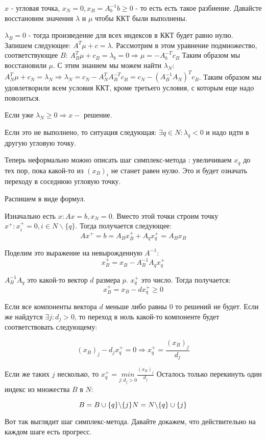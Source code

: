 $x$ - угловая точка, $x_N = 0, x_B = A_b^{-1}b \ge 0$ - то есть есть такое разбиение. Давайсте восстановим значения $\lambda $ и $\mu$ чтобы ККТ были выполнены.

$\lambda_B = 0$ - тогда произведение для всех индексов в ККТ будет равно нулю. Запишем следующее: $A^T\mu + c = \lambda$.  Рассмотрим в этом уравнение подмножество, соответствующее $B$: $A_B^T \mu + c_B = \lambda_b = 0 \Rightarrow \mu = -A_b^{-T} c_B$ Таким образом мы восстановили $\mu$.  С этим знанием мы можем найти $\lambda_N$: $A_N^T \mu + c_N = \lambda_N \Rightarrow \lambda_N = c_N - A_N^T A_B^{-T} c_B = c_N - (A_B^{-1} A_N)^T c_B$. Таким образом мы удовлетворили всем условия ККТ, кроме третьего условия, с которым еще надо повозиться.

Если уже $\lambda_N \ge 0 \Rightarrow x - $ решение.

Если это не выполнено, то ситуация следующая:
$\exists q \in N : \lambda_q < 0$ и надо идти в другую угловую точку.

Теперь неформально можно описать шаг симплекс-метода : увеличиваем $x_q$ до тех пор, пока какой-то из $(x_B)_i$ не станет равен нулю. Это и будет означать переходу в соседнюю угловую точку.

 Распишем в виде формул.

 Изначально есть $x: Ax = b, x_N = 0$. Вместо этой точки строим точку $x^+ : x_i^+ = 0, i\in N\backslash \{q\}$. Тогда получается следующее: $$
 Ax^+ = b = A_B x_B^+ + A_q x_q^+ = A_B x_B
 $$

Поделим это выражение на невырожденную $A^{-1}$:
$$
x_B^+ = x_B - A_B^{-1} A_q x_q^+
$$

$A_B^{-1} A_q$ это какой-то вектор $d$ размера $p$. $x_q^+$ это число. Тогда получается:
$$
x_B^+ = x_B - d x_q^+ \ge 0
$$

Если все компоненты вектора $d$ меньше либо равны $0$ то решений не будет. Если же найдутся $\exists j : d_j > 0$, то переход в ноль какой-то компоненте будет соответствовать следующему:

$$
(x_B)_j - d_j x_q^+ = 0 \Rightarrow x_q^+ = \frac{(x_B)_j}{d_j}
$$

Если же таких $j$ несколько, то $x_q^+ = \underset{j:d_j > 0}{min} \frac{(x_B)_j}{d_j}$
 Осталось только перекинуть один индекс из множества $B$ в $N$:

 $$
 B = B \cup \{q\} \backslash \{j\} \\
 N = N \backslash \{q\} \cup \{j\}
 $$

 Вот так выглядит шаг симплекс-метода. Давайте докажем, что действительно на каждом шаге есть прогресс.

